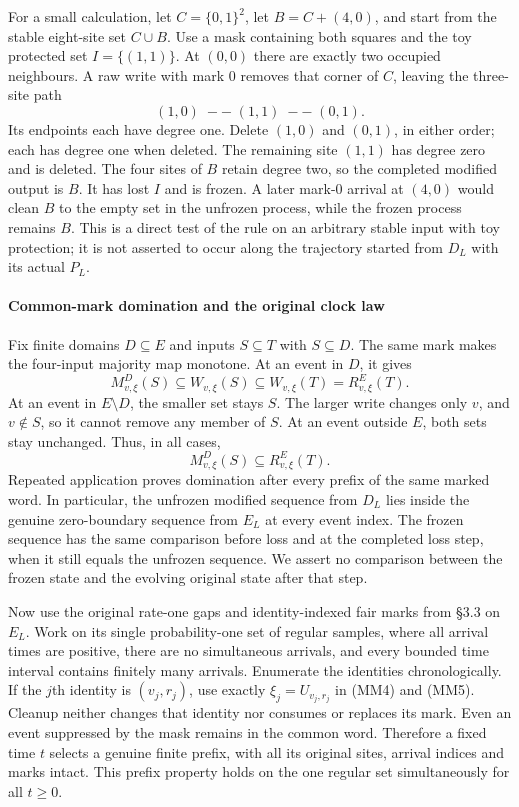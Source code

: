 \documentclass[
  11pt,
  a4paper,
]{article}
\begin{document}
For a small calculation, let \(C=\{0,1\}^2\), let \(B=C+(4,0)\), and
start from the stable eight-site set \(C\cup B\). Use a mask containing
both squares and the toy protected set \(I=\{(1,1)\}\). At \((0,0)\)
there are exactly two occupied neighbours. A raw write with mark \(0\)
removes that corner of \(C\), leaving the three-site path \[
(1,0)\;--\;(1,1)\;--\;(0,1).
\] Its endpoints each have degree one. Delete \((1,0)\) and \((0,1)\),
in either order; each has degree one when deleted. The remaining site
\((1,1)\) has degree zero and is deleted. The four sites of \(B\) retain
degree two, so the completed modified output is \(B\). It has lost \(I\)
and is frozen. A later mark-\(0\) arrival at \((4,0)\) would clean \(B\)
to the empty set in the unfrozen process, while the frozen process
remains \(B\). This is a direct test of the rule on an arbitrary stable
input with toy protection; it is not asserted to occur along the
trajectory started from \(D_L\) with its actual \(P_L\).

\paragraph{Common-mark domination and the original clock
law}\label{common-mark-domination-and-the-original-clock-law}

Fix finite domains \(D\subseteq E\) and inputs \(S\subseteq T\) with
\(S\subseteq D\). The same mark makes the four-input majority map
monotone. At an event in \(D\), it gives \[
M^D_{v,\xi}(S)\subseteq W_{v,\xi}(S)
\subseteq W_{v,\xi}(T)=R^E_{v,\xi}(T).
\] At an event in \(E\setminus D\), the smaller set stays \(S\). The
larger write changes only \(v\), and \(v\notin S\), so it cannot remove
any member of \(S\). At an event outside \(E\), both sets stay
unchanged. Thus, in all cases, \[
M^D_{v,\xi}(S)\subseteq R^E_{v,\xi}(T).
\tag{MM7}
\] Repeated application proves domination after every prefix of the same
marked word. In particular, the unfrozen modified sequence from \(D_L\)
lies inside the genuine zero-boundary sequence from \(E_L\) at every
event index. The frozen sequence has the same comparison before loss and
at the completed loss step, when it still equals the unfrozen sequence.
We assert no comparison between the frozen state and the evolving
original state after that step.

Now use the original rate-one gaps and identity-indexed fair marks from
§3.3 on \(E_L\). Work on its single probability-one set of regular
samples, where all arrival times are positive, there are no simultaneous
arrivals, and every bounded time interval contains finitely many
arrivals. Enumerate the identities chronologically. If the \(j\)th
identity is \((v_j,r_j)\), use exactly \(\xi_j=U_{v_j,r_j}\) in (MM4)
and (MM5). Cleanup neither changes that identity nor consumes or
replaces its mark. Even an event suppressed by the mask remains in the
common word. Therefore a fixed time \(t\) selects a genuine finite
prefix, with all its original sites, arrival indices and marks intact.
This prefix property holds on the one regular set simultaneously for all
\(t\geq0\).
\end{document}
